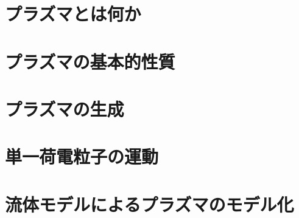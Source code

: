 \documentclass{report}
\begin{document}
  \maketitle
  \tableofcontents
  \setcounter{chapter}{-1}
  \chapter{プラズマとは何か}
    
  \chapter{プラズマの基本的性質}
    
  \chapter{プラズマの生成}
    
  \chapter{単一荷電粒子の運動}
    
  \chapter{流体モデルによるプラズマのモデル化}
    
  \printindex
\end{document}
